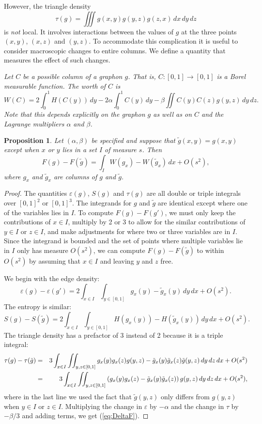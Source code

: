 \documentclass[12pt]{amsart}
\newtheorem{proposition}[lemma]{Proposition}
\newcommand\be{\begin{equation}}
\newcommand\ee{\end{equation}}
\newcommand{\tdens}{\tau}
\newcommand{\edens}{\varepsilon}
\newcommand{\Value}{worth}
\begin{document}
{However, the triangle density \be \tdens(g) = \iiint g(x,y) g(y,z)
g(z,x) \, dx \, dy \, dz \ee is {\em not} local. It involves
interactions between the values of $g$ at  the three points  $(x,y)$, $(x,z)$ and $(y,z)$.
To accommodate this complication it is useful to consider macroscopic changes to entire columns. 
We define a quantity that measures the effect of such changes.

\noindent {\bf Definition of \Value{}:} {\em Let $C$ be a possible column of a graphon $g$. That is, $C: [0,1] \to 
[0,1]$ is a Borel measurable function. The {\em \Value} of
$C$ is \be W(C) = 2 \int_0^1 H(C(y)) \, dy -
2 \alpha \int_0^1 C(y)\, dy - \beta \iint C(y) C(z) g(y,z) \, dy\, dz.
\label{eq:value} \ee
Note that this depends explicitly on the graphon $g$ as well as on $C$ and the 
Lagrange multipliers $\alpha$ and $\beta$. }
\medskip

\begin{proposition} Let $(\alpha, \beta)$ be specified and suppose that $\tilde g(x,y) = g(x,y)$ except when $x$ or $y$
lies in a set $I$ of measure $s$. Then 
\be \label{eq:DeltaF} F(g) - F(\tilde g) = \int_I W(g_x)-W(\tilde g_x) \, dx + O(s^2), \ee
where $g_x$ and $\tilde g_x$ are columns of $g$ and $\tilde g$. 
\end{proposition} 


\begin{proof} The quantities $\edens(g)$, $S(g)$ and $\tdens(g)$ are all double or triple integrals over 
$[0,1]^2$ or $[0,1]^3$. The integrands for $g$ and $\tilde g$ are identical except where one of the variables lies in 
$I$. To compute $F(g)-F(g')$, we must only keep the contributions of $x \in I$, multiply by 2 or 3 to allow for
the similar contributions of $y \in I$ or $z \in I$, and make adjustments for where two or three variables are in $I$.
Since the integrand is bounded and the set of points where multiple variables lie in $I$ only has measure $O(s^2)$, we
can compute $F(g)-F(\tilde g)$ to within $O(s^2)$ by assuming that $x \in I$ and leaving $y$ and $z$ free. 

We begin with the edge density: 
\be \edens(g) - \edens(g') = 2 \int_{x \in I} \int_{y\in[0,1]} g_x(y)-\tilde g_x(y) \,dy \, dx + O(s^2). \ee
The entropy is similar:
\be S(g) - S(\tilde g) = 2 \int_{x \in I} \int_{y\in[0,1]} H(g_x(y))-H(\tilde g_x(y)) \, dy \, dx + O(s^2). \ee
The triangle density has a prefactor of 3 instead of 2 because it is a triple integral:
\begin{eqnarray} \tdens(g)-\tdens(\tilde g) &=& 3 \int_{x \in I} \iint_{y,z\in[0,1]} g_x(y)g_x(z)g(y,z)-\tilde g_x(y)\tilde g_x(z)\tilde g(y,z) \,dy \, dz \, dx + O(s^2) \cr 
 &=& 3 \int_{x \in I} \iint_{y,z\in[0,1]} \left (g_x(y)g_x(z)-\tilde g_x(y)\tilde g_x(z)\right ) g(y,z) \,dy \, dz \, dx + O(s^2), 
 \end{eqnarray}
 where in the last line we used the fact that $\tilde g(y,z)$ only differs from $g(y,z)$ when $y\in I$
 or $z \in I$. 
 Multiplying the change in $\edens$ by $-\alpha$ and the change in $\tdens$ by $-\beta/3$ and adding terms, we get
 (\ref{eq:DeltaF}). 
 \end{proof}

}
\end{document}
